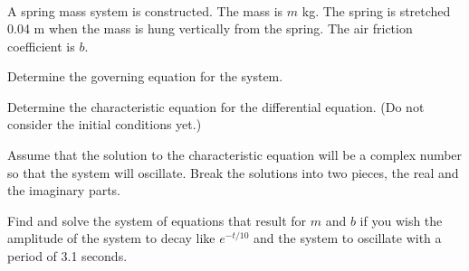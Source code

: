   \begin{problem}
  \item 
    \begin{eqnarray}
    \end{eqnarray}
    \begin{subproblem}
    \item 
      \vspace{2em}
    \item 
      \vfill

    \clearpage

  \item 
    \vspace{4em}

  \item 
    \vfill

  \item 
    \vfill


  \end{subproblem}


\begin{problem}
\item A spring mass system is constructed. The mass is $m$ kg. The
  spring is stretched 0.04 m when the mass is hung vertically from the
  spring. The air friction coefficient is $b$.

    \begin{subproblem}
      \item Determine the governing equation for the system. 
        \vfill

      \item Determine the characteristic equation for the differential
        equation. (Do not consider the initial conditions yet.)
        \vfill

        \clearpage

      \item Assume that the solution to the characteristic equation
        will be a complex number so that the system will
        oscillate. Break the solutions into two pieces, the real and
        the imaginary parts.

        \vfill

      \item Find and solve the system of equations that result for $m$
        and $b$ if you wish the amplitude of the system to decay like
        $e^{-t/10}$ and the system to oscillate with a period of 3.1
        seconds.

        \vfill

    \end{subproblem}


\end{problem}


  \end{problem}

